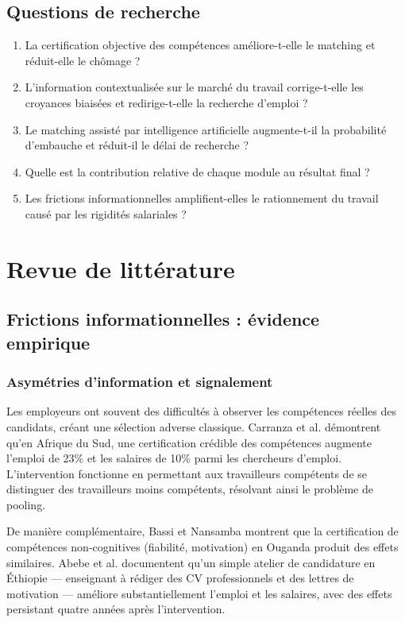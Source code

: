 \documentclass[12pt]{article}
\begin{document}
\subsection{Questions de recherche}

\begin{enumerate}
    \item La certification objective des compétences améliore-t-elle le matching et réduit-elle le chômage ?
    \item L'information contextualisée sur le marché du travail corrige-t-elle les croyances biaisées et redirige-t-elle la recherche d'emploi ?
    \item Le matching assisté par intelligence artificielle augmente-t-il la probabilité d'embauche et réduit-il le délai de recherche ?
    \item Quelle est la contribution relative de chaque module au résultat final ?
    \item Les frictions informationnelles amplifient-elles le rationnement du travail causé par les rigidités salariales ?
\end{enumerate}

\section{Revue de littérature}

\subsection{Frictions informationnelles : évidence empirique}

\subsubsection{Asymétries d'information et signalement}

Les employeurs ont souvent des difficultés à observer les compétences réelles des candidats, créant une sélection adverse classique. Carranza et al. \citeyearpar{carranza2022} démontrent qu'en Afrique du Sud, une certification crédible des compétences augmente l'emploi de 23\% et les salaires de 10\% parmi les chercheurs d'emploi. L'intervention fonctionne en permettant aux travailleurs compétents de se distinguer des travailleurs moins compétents, résolvant ainsi le problème de pooling.

De manière complémentaire, Bassi et Nansamba \citeyearpar{bassi2022} montrent que la certification de compétences non-cognitives (fiabilité, motivation) en Ouganda produit des effets similaires. Abebe et al. \citeyearpar{abebe2021} documentent qu'un simple atelier de candidature en Éthiopie — enseignant à rédiger des CV professionnels et des lettres de motivation — améliore substantiellement l'emploi et les salaires, avec des effets persistant quatre années après l'intervention.
\end{document}
